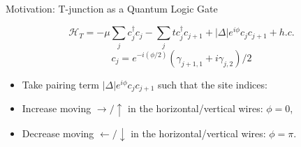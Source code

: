 \documentclass[xcolor=dvipsnames,10pt,aspectratio=169]{beamer}
\newcommand{\ham}{\mathcal{H}}
\newcommand{\cc}{c^{\dagger}}
\newcommand{\de}{\Delta}
\newcommand{\MO}{Motivation}
\begin{document}
  \begin{frame}{\MO: T-junction as a Quantum Logic Gate}

    \begin{multicols}{3}
    \begin{figure}
      \end{figure}

      \begin{minipage}{0.67\textwidth}
      \small
      \begin{equation}
        \ham_T = -\mu \sum_j \cc_j c_j - \sum_j t \cc_j c_{j+1} + |\de| e^{i\phi} c_j c_{j+1} + h.c.
      \end{equation}
      \begin{equation}
        c_j = e^{-i(\phi/2)}(\gamma_{j+1,1} + i \gamma_{j,2})/2
      \end{equation}
      \begin{itemize}
        \footnotesize
        \item Take pairing term $|\de|e^{i\phi} c_j c_{j+1}$ such that the site indices:
        \item Increase moving $\rightarrow / \uparrow$ in the horizontal/vertical wires: $\phi=0$,
        \item Decrease moving $\leftarrow / \downarrow$ in the horizontal/vertical wires: $\phi=\pi$.
      \end{itemize}


\end{minipage}
\end{multicols}
\end{frame}
\end{document}
